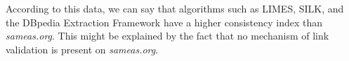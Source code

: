 \begin{table}[ht]
\centering
\caption{Comparison of results with respect to the provenance of the links.}
\label{tab:frameworks}
\end{table}
%
According to this data, we can say that algorithms such as LIMES, SILK, and the DBpedia Extraction Framework have a higher consistency index than \textit{sameas.org}. This might be explained by the fact that no mechanism of link validation is present on \textit{sameas.org}.
 


